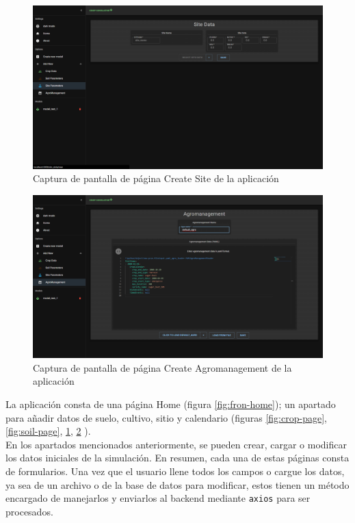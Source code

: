 \begin{figure}[!h]
	\centering
	\includegraphics[width=0.6\linewidth]{Images/site-page}
	\caption{Captura de pantalla de página Create Site de la aplicación}
	\label{fig:site-page}
\end{figure}

\begin{figure}[!h]
	\centering
	\includegraphics[width=0.6\linewidth]{Images/agro-page}
	\caption{Captura de pantalla de página Create Agromanagement de la aplicación}
	\label{fig:agro-page}
\end{figure}

La aplicación consta de una página Home (figura \ref{fig:fron-home}); un apartado para añadir datos de suelo, cultivo, sitio y calendario (figuras \ref{fig:crop-page}, \ref{fig:soil-page}, \ref{fig:site-page}, \ref{fig:agro-page} ).\\

En los apartados mencionados anteriormente, se pueden crear, cargar o modificar los datos iniciales de la simulación. En resumen, cada una de estas páginas consta de formularios. Una vez que el usuario llene todos los campos o cargue los datos, ya sea de un archivo o de la base de datos para modificar, estos tienen un método encargado de manejarlos y enviarlos al backend mediante \lstinline|axios| para ser procesados. 

